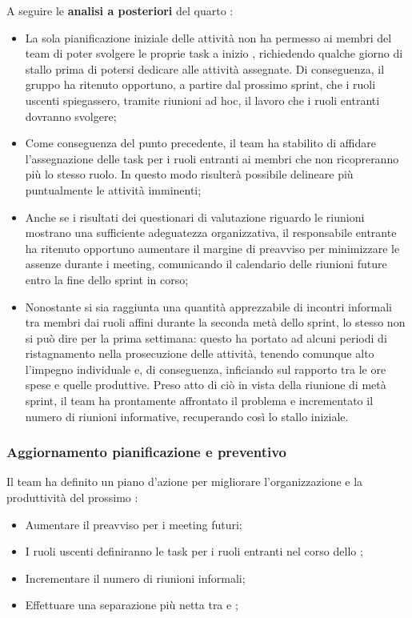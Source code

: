 \vspace{0.5\baselineskip}
\par A seguire le \textbf{analisi a posteriori} del quarto :
\begin{itemize}
  \item La sola pianificazione iniziale delle attività non ha permesso ai membri del team di poter svolgere le proprie task a inizio , richiedendo qualche giorno di stallo prima di potersi dedicare alle attività assegnate. Di conseguenza, il gruppo ha ritenuto opportuno, a partire dal prossimo sprint, che i ruoli uscenti spiegassero, tramite riunioni ad hoc, il lavoro che i ruoli entranti dovranno svolgere;
  \item Come conseguenza del punto precedente, il team ha stabilito di affidare l'assegnazione delle task per i ruoli entranti ai membri che non ricopreranno più lo stesso ruolo. In questo modo risulterà possibile delineare più puntualmente le attività imminenti;
  \item Anche se i risultati dei questionari di valutazione riguardo le riunioni mostrano una sufficiente adeguatezza organizzativa, il responsabile entrante ha ritenuto opportuno aumentare il margine di preavviso per minimizzare le assenze durante i meeting, comunicando il calendario delle riunioni future entro la fine dello sprint in corso;
  \item Nonostante si sia raggiunta una quantità apprezzabile di incontri informali tra membri dai ruoli affini durante la seconda metà dello sprint, lo stesso non si può dire per la prima settimana: questo ha portato ad alcuni periodi di ristagnamento nella prosecuzione delle attività, tenendo comunque alto l'impegno individuale e, di conseguenza, inficiando sul rapporto tra le ore spese e quelle produttive. Preso atto di ciò in vista della riunione di metà sprint, il team ha prontamente affrontato il problema e incrementato il numero di riunioni informative, recuperando così lo stallo iniziale.
\end{itemize}

\subsubsection{Aggiornamento pianificazione e preventivo}
\par Il team ha definito un piano d'azione per migliorare l'organizzazione e la produttività del prossimo :
\begin{itemize}
  \item Aumentare il preavviso per i meeting futuri;
  \item I ruoli uscenti definiranno le task per i ruoli entranti nel corso dello ;
  \item Incrementare il numero di riunioni informali;
  \item Effettuare una separazione più netta tra  e ;
\end{itemize}

